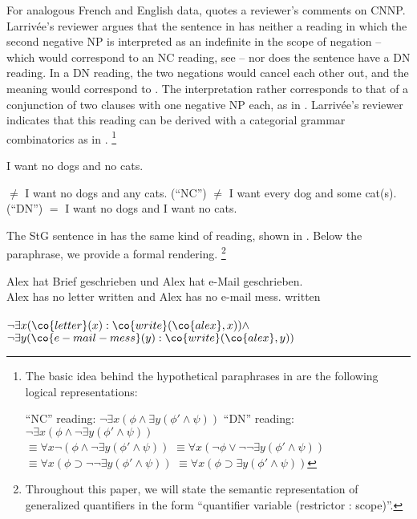 \documentclass[output=paper]{langsci/langscibook}
\begin{document}
For analogous French and English data, \citet[188, footnote~1]{Larrivee:16} quotes a reviewer's comments on CNNP.
Larrivée's reviewer argues that the sentence in  has neither a reading in which the second negative NP is interpreted as an indefinite in the scope of negation -- which would correspond to an NC reading, see  --  nor does the sentence have a DN reading.
In a DN reading, the two negations would cancel each other out, and the meaning would correspond to  .
The interpretation rather corresponds to that of a conjunction of two clauses with one negative NP each, as in .
Larrivée's reviewer indicates that this reading can be derived with a categorial grammar combinatorics as in \citet{Keenan:Faltz:85}.%
\footnote{The basic idea behind the hypothetical paraphrases in  are the following logical representations:

\ea
\textnormal{``NC'' reading:} $\lnot \exists x (\phi \land \exists y (\phi' \land \psi))$
\ex
\textnormal{``DN'' reading:} $\lnot \exists x (\phi \land \lnot \exists y (\phi' \land \psi))$\\
$\equiv \forall x \lnot (\phi \land \lnot \exists y (\phi' \land \psi))$
$\equiv \forall x (\lnot \phi \lor \lnot \lnot \exists y (\phi' \land \psi))$\\
$\equiv \forall x (\phi \supset \lnot \lnot \exists y (\phi' \land \psi))$
$\equiv \forall x (\phi \supset \exists y (\phi' \land \psi))$
\z}

\ea \label{ex-dogcat}
I want no dogs and no cats.
\begin{xlist}
\ex $\not=$ I want no dogs and any cats. (``NC'')
\label{ex-dogcat-nc}
\ex $\not=$ I want every dog and some cat(s).  (``DN'')
\label{ex-dogcat-dn}
\ex $=$ I want no dogs and I want no cats.\label{ex-dogcat-para}
\end{xlist}
\z

The StG sentence in  has the same kind of reading, shown in . 
Below the paraphrase, we provide a formal rendering.%
\footnote{Throughout this paper, we will state the semantic representation of generalized quantifiers in the form ``quantifier variable (restrictor : scope)''.}

\ea \label{ex-conj-de-para}
\gll Alex hat  Brief geschrieben und Alex hat  e-Mail geschrieben.\\
Alex has no letter written and Alex has no {e-mail mess.} written\\
\glt {}\\
$\lnot \exists x (\co{letter}(x) : \co{write}(\co{alex}, x)) \land $
$\lnot \exists y (\co{e-mail-mess}(y) : \co{write}(\co{alex}, y))$
\z
\end{document}

